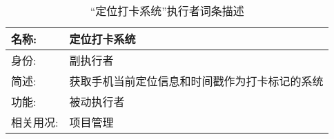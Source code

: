 \begin{table}[H]  
\caption{“定位打卡系统”执行者词条描述}  
\begin{center}  
    \begin{tabular}{l p{11cm}} 
        \hline
        \quad 名称:  &  定位打卡系统 \\
        \hline
        \quad 身份:  & 副执行者 \\
        \hline
        \quad 简述:  & 获取手机当前定位信息和时间戳作为打卡标记的系统 \\
        \hline
        \quad 功能:  & 被动执行者 \\
        \hline
        \quad 相关用况:  & 项目管理 \\
        \hline
    \end{tabular}
\end{center}
\end{table}

